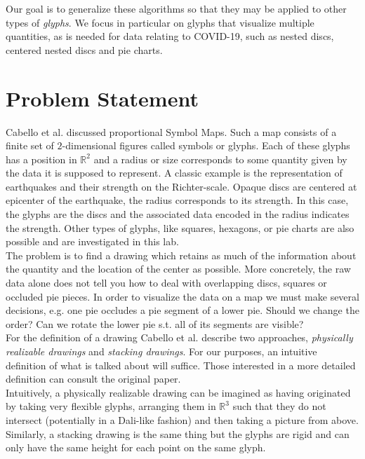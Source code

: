 \documentclass[a4paper,11pt]{article}
\begin{document}
Our goal is to generalize these algorithms so that they may be applied to other types of \textit{glyphs}. We focus in particular on glyphs that visualize multiple quantities, as is needed for data relating to COVID-19, such as nested discs, centered nested discs and pie charts.

\newpage

\section{Problem Statement}
Cabello et al. discussed proportional Symbol Maps. Such a map consists of a finite set of $2$-dimensional figures called symbols or glyphs. Each of these glyphs has a position in $\mathbb{R}^2$ and a radius or size corresponds to some quantity given by the data it is supposed to represent. A classic example is the representation of earthquakes and their strength on the Richter-scale. Opaque discs are centered at epicenter of the earthquake, the radius corresponds to its strength. In this case, the glyphs are the discs and the associated data encoded in the radius indicates the strength. Other types of glyphs, like squares, hexagons, or pie charts are also possible and are investigated in this lab.\\

The problem is to find a drawing which retains as much of the information about the quantity and the location of the center as possible. More concretely, the raw data alone does not tell you how to deal with overlapping discs, squares or occluded pie pieces. In order to visualize the data on a map we must make several decisions, e.g. one pie occludes a pie segment of a lower pie. Should we change the order? Can we rotate the lower pie s.t. all of its segments are visible?\\

For the definition of a drawing Cabello et al. describe two approaches, \textit{physically realizable drawings} and \textit{stacking drawings}. For our purposes, an intuitive definition of what is talked about will suffice. Those interested in a more detailed definition can consult the original paper.\\

Intuitively, a physically realizable drawing can be imagined as having originated by taking very flexible glyphs, arranging them in $\mathbb{R}^3$ such that they do not intersect  (potentially in a Dali-like fashion) and then taking a picture from above.\\
Similarly, a stacking drawing is the same thing but the glyphs are rigid and can only have the same height for each point on the same glyph.\\
\end{document}
